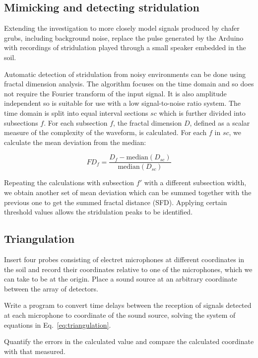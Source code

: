 \documentclass[twocolumn]{article}
\begin{document}
\subsection{Mimicking and detecting stridulation}
Extending the investigation to more closely model signals produced by chafer grubs, including background noise, replace the pulse generated by the Arduino with recordings of stridulation played through a small speaker embedded in the soil.

Automatic detection of stridulation from noisy environments can be done using fractal dimension analysis. The algorithm focuses on the time domain and so does not require the Fourier transform of the input signal. It is also amplitude independent so is suitable for use with a low signal-to-noise ratio system. The time domain is split into equal interval sections $sc$ which is further divided into subsections $f$. For each subsection $f$, the fractal dimension $D$, defined as a scalar measure of the complexity of the waveform, is calculated. For each $f$ in $sc$, we calculate the mean deviation from the median:

\begin{equation}
    FD_f = \frac{D_f-\text{median}(D_{sc})}{\text{median}(D_{sc})}
\end{equation}

Repeating the calculations with subsection $f'$ with a different subsection width, we obtain another set of mean deviation which can be summed together with the previous one to get the summed fractal distance (SFD). Applying certain threshold values allows the stridulation peaks to be identified.

\subsection{Triangulation}
Insert four probes consisting of electret microphones at different coordinates in the soil and record their coordinates relative to one of the microphones, which we can take to be at the origin. Place a sound source at an arbitrary coordinate between the array of detectors.

Write a program to convert time delays between the reception of signals detected at each microphone to coordinate of the sound source, solving the system of equations in Eq.~\ref{eq:triangulation}.

Quantify the errors in the calculated value and compare the calculated coordinate with that measured.

\printbibliography
\end{document}
